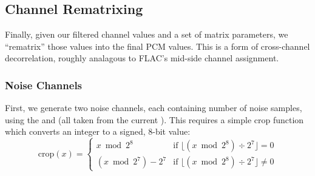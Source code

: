 \clearpage

\subsection{Channel Rematrixing}

Finally, given our filtered channel values and a set of matrix parameters,
we ``rematrix'' those values into the final PCM values.
This is a form of cross-channel decorrelation, roughly analagous
to FLAC's mid-side channel assignment.

\subsubsection{Noise Channels}

First, we generate two noise channels, each containing
 number of noise samples, using the
 and  (all taken from the
current ).
This requires a simple crop function which converts an integer
to a signed, 8-bit value:
\begin{equation*}
\text{crop}(x) =
\begin{cases}
x \bmod{2 ^ 8} & \text{if } \lfloor (x \bmod{2 ^ 8}) \div 2 ^ 7\rfloor = 0 \\
(x \bmod{2 ^ 7}) - 2 ^ 7 & \text{if } \lfloor (x \bmod{2 ^ 8}) \div 2 ^ 7\rfloor \neq 0
\end{cases}
\end{equation*}

